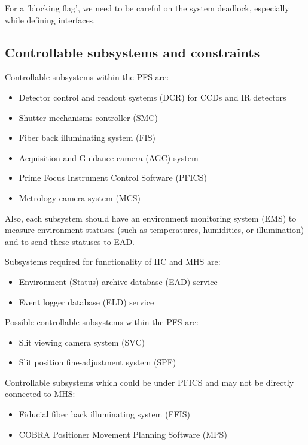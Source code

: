 \documentclass[a4paper,notitlepage]{article}
\begin{document}
For a 'blocking flag', we need to be careful on the system deadlock, 
especially while defining interfaces. 

\subsection{Controllable subsystems and constraints}

Controllable subsystems within the PFS are: 

\begin{itemize}
  \item Detector control and readout systems (DCR) for CCDs and IR detectors
  \item Shutter mechanisms controller (SMC)
  \item Fiber back illuminating system (FIS)
  \item Acquisition and Guidance camera (AGC) system
  \item Prime Focus Instrument Control Software (PFICS)
  \item Metrology camera system (MCS)
\end{itemize}

Also, each subsystem should have an environment monitoring system (EMS) to 
measure environment statuses (such as temperatures, humidities, or 
illumination) and to send these statuses to EAD. 

Subsystems required for functionality of IIC and MHS are: 

\begin{itemize}
  \item Environment (Status) archive database (EAD) service
  \item Event logger database (ELD) service
\end{itemize}

Possible controllable subsystems within the PFS are: 

\begin{itemize}
  \item Slit viewing camera system (SVC)
  \item Slit position fine-adjustment system (SPF)
\end{itemize}

Controllable subsystems which could be under PFICS and may not be directly 
connected to MHS: 

\begin{itemize}
  \item Fiducial fiber back illuminating system (FFIS)
  \item COBRA Positioner Movement Planning Software (MPS)
\end{itemize}
\end{document}
